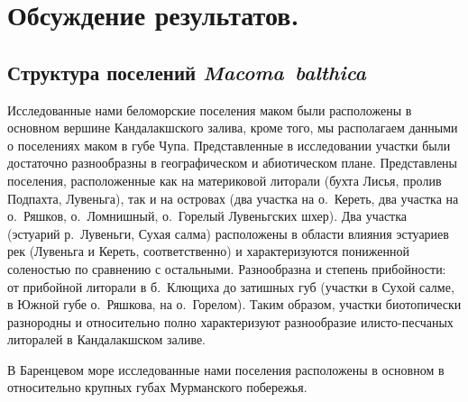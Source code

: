 		\chapter{Обсуждение результатов.}

\section{Структура поселений \textit{Macoma~balthica} }

Исследованные нами беломорские поселения маком были расположены в основном вершине Кандалакшского залива, кроме того, мы располагаем данными о поселениях маком в губе Чупа. 
Представленные в исследовании участки были достаточно разнообразны в географическом и абиотическом плане.
Представлены поселения, расположенные как на материковой литорали (бухта Лисья, пролив Подпахта, Лувеньга), так и на островах (два участка на о.~Кереть, два участка на о.~Ряшков, о.~Ломнишный, о.~Горелый Лувеньгских шхер). 
Два участка (эстуарий р.~Лувеньги, Сухая салма) расположены в области влияния эстуариев рек (Лувеньга и Кереть, соответственно)  и характеризуются пониженной соленостью по сравнению с остальными.
Разнообразна и степень прибойности: от прибойной литорали в б.~Клющиха до затишных губ (участки в Сухой салме, в Южной губе о.~Ряшкова, на о.~Горелом).
Таким образом, участки биотопически разнородны и относительно полно характеризуют разнообразие илисто-песчаных литоралей в Кандалакшском заливе.

В Баренцевом море исследованные нами поселения расположены в основном в относительно крупных губах Мурманского побережья.


